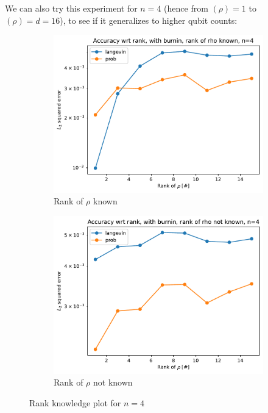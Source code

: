 \documentclass[12pt]{memoir}
\newcommand{\rhorankn}[1]{\text{rank}$(\rho)=#1$}
\begin{document}
We can also try this experiment for $n=4$ (hence from \rhorankn{1} to \rhorankn{d=16}), to see if it generalizes to higher qubit counts:
\begin{figure}[H]
    \centering
    \begin{subfigure}[b]{0.49\textwidth}
        \centering
        \includegraphics[width=\textwidth]{figures/experiments/rank_info/rank_known_n4-1.png}
        \caption{Rank of $\rho$ known}
        \label{fig:rank-info-n4-sub}
    \end{subfigure}
    \hfill
    \begin{subfigure}[b]{0.49\textwidth}
        \centering
        \includegraphics[width=\textwidth]{figures/experiments/rank_info/rank_not_known_n4-1.png}
        \caption{Rank of $\rho$ not known}
        \label{fig:rank-no-info-n4-sub}
    \end{subfigure}
    \caption{Rank knowledge plot for $n=4$}
    \label{fig:rank-info-n4}
\end{figure}
\end{document}
